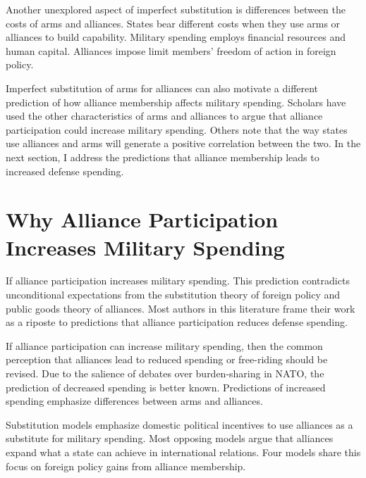 \documentclass[12pt]{article}
\begin{document}
Another unexplored aspect of imperfect substitution is differences between the costs of arms and alliances. 
States bear different costs when they use arms or alliances to build capability.
Military spending employs financial resources and human capital. 
Alliances impose limit members' freedom of action in foreign policy. 


Imperfect substitution of arms for alliances can also motivate a different prediction of how alliance membership affects military spending.
Scholars have used the other characteristics of arms and alliances to argue that alliance participation could increase military spending.
Others note that the way states use alliances and arms will generate a positive correlation between the two. 
In the next section, I address the predictions that alliance membership leads to increased defense spending. 




\section{Why Alliance Participation Increases Military Spending}


If alliance participation increases military spending. 
This prediction contradicts unconditional expectations from the substitution theory of foreign policy and public goods theory of alliances. 
Most authors in this literature frame their work as a riposte to predictions that alliance participation reduces defense spending. 


If alliance participation can increase military spending, then the common perception that alliances lead to reduced spending or free-riding should be revised. 
Due to the salience of debates over burden-sharing in NATO, the prediction of decreased spending is better known. 
Predictions of increased spending emphasize differences between arms and alliances. 


Substitution models emphasize domestic political incentives to use alliances as a substitute for military spending.  
Most opposing models argue that alliances expand what a state can achieve in international relations. 
Four models share this focus on foreign policy gains from alliance membership. 
\end{document}
